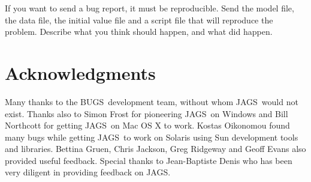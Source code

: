 \documentclass[11pt, a4paper, titlepage]{report}
\newcommand{\JAGS}{\textsf{JAGS}}
\newcommand{\BUGS}{\textsf{BUGS}}
\begin{document}
If you want to send a bug report, it must be reproducible. Send the
model file, the data file, the initial value file and a script file
that will reproduce the problem. Describe what you think should
happen, and what did happen.

\chapter{Acknowledgments}

Many thanks to the \BUGS\ development team, without whom \JAGS\ would
not exist.  Thanks also to Simon Frost for pioneering \JAGS\ on
Windows and Bill Northcott for getting \JAGS\ on Mac OS X to
work. Kostas Oikonomou found many bugs while getting \JAGS\ to work on
Solaris using Sun development tools and libraries.  Bettina Gruen,
Chris Jackson, Greg Ridgeway and Geoff Evans also provided useful
feedback.  Special thanks to Jean-Baptiste Denis who has been very
diligent in providing feedback on JAGS.



\end{document}
